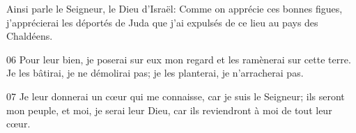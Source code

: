 Ainsi parle le Seigneur, le Dieu d’Israël: Comme on apprécie ces bonnes figues, j’apprécierai les déportés de Juda que j’ai expulsés de ce lieu au pays des Chaldéens.

06 Pour leur bien, je poserai sur eux mon regard et les ramènerai sur cette terre. Je les bâtirai, je ne démolirai pas; je les planterai, je n’arracherai pas.

07 Je leur donnerai un cœur qui me connaisse, car je suis le Seigneur; ils seront mon peuple, et moi, je serai leur Dieu, car ils reviendront à moi de tout leur cœur.